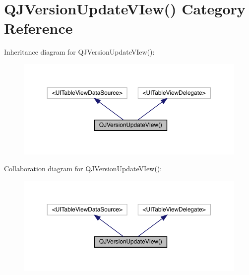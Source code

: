 \hypertarget{category_q_j_version_update_v_iew_07_08}{}\section{Q\+J\+Version\+Update\+V\+Iew() Category Reference}
\label{category_q_j_version_update_v_iew_07_08}


Inheritance diagram for Q\+J\+Version\+Update\+V\+Iew()\+:\nopagebreak
\begin{figure}[H]
\begin{center}
\leavevmode
\includegraphics[width=350pt]{category_q_j_version_update_v_iew_07_08__inherit__graph}
\end{center}
\end{figure}


Collaboration diagram for Q\+J\+Version\+Update\+V\+Iew()\+:\nopagebreak
\begin{figure}[H]
\begin{center}
\leavevmode
\includegraphics[width=350pt]{category_q_j_version_update_v_iew_07_08__coll__graph}
\end{center}
\end{figure}

